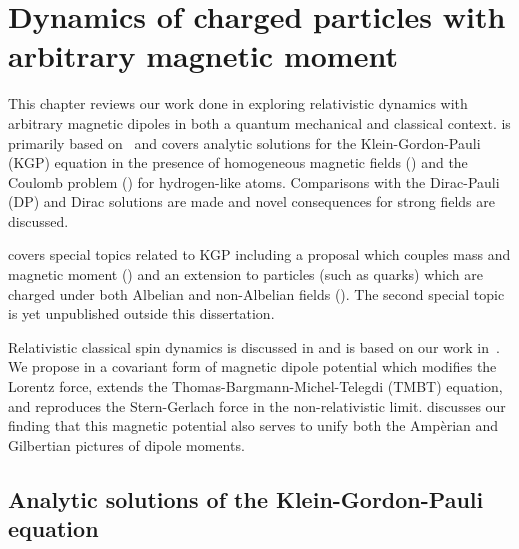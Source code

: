 \chapter{Dynamics of charged particles with arbitrary magnetic moment}
\noindent This chapter reviews our work done in exploring relativistic dynamics with arbitrary magnetic dipoles in both a quantum mechanical and classical context.  is primarily based on~\cite{Steinmetz:2018ryf} and covers analytic solutions for the Klein-Gordon-Pauli (KGP) equation in the presence of homogeneous magnetic fields () and the Coulomb problem () for hydrogen-like atoms. Comparisons with the Dirac-Pauli (DP) and Dirac solutions are made and novel consequences for strong fields are discussed.

 covers special topics related to KGP including a proposal which couples mass and magnetic moment () and an extension to particles (such as quarks) which are charged under both Albelian and non-Albelian fields (). The second special topic is yet unpublished outside this dissertation.

Relativistic classical spin dynamics is discussed in  and is based on our work in~\cite{Rafelski:2017hce}. We propose in  a covariant form of magnetic dipole potential which modifies the Lorentz force, extends the Thomas-Bargmann-Michel-Telegdi (TMBT) equation, and reproduces the Stern-Gerlach force in the non-relativistic limit.  discusses our finding that this magnetic potential also serves to unify both the Amp{\`e}rian and Gilbertian pictures of dipole moments.

\section{Analytic solutions of the Klein-Gordon-Pauli equation}
\label{sec:kgpapplications}


